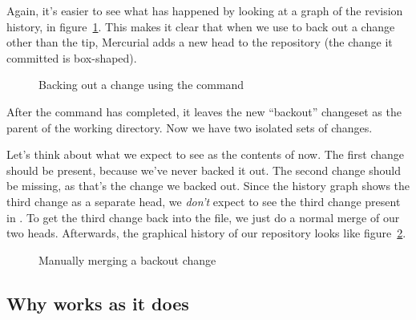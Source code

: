 Again, it's easier to see what has happened by looking at a graph of
the revision history, in figure~\ref{fig:undo:backout-manual}.  This
makes it clear that when we use  to back out a change
other than the tip, Mercurial adds a new head to the repository (the
change it committed is box-shaped).

\begin{figure}[htb]
  \centering
  \caption{Backing out a change using the  command}
  \label{fig:undo:backout-manual}
\end{figure}

After the  command has completed, it leaves the new
``backout'' changeset as the parent of the working directory.
Now we have two isolated sets of changes.

Let's think about what we expect to see as the contents of
 now.  The first change should be present, because
we've never backed it out.  The second change should be missing, as
that's the change we backed out.  Since the history graph shows the
third change as a separate head, we \emph{don't} expect to see the
third change present in .
To get the third change back into the file, we just do a normal merge
of our two heads.
Afterwards, the graphical history of our repository looks like
figure~\ref{fig:undo:backout-manual-merge}.

\begin{figure}[htb]
  \centering
  \caption{Manually merging a backout change}
  \label{fig:undo:backout-manual-merge}
\end{figure}

\subsection{Why  works as it does}

